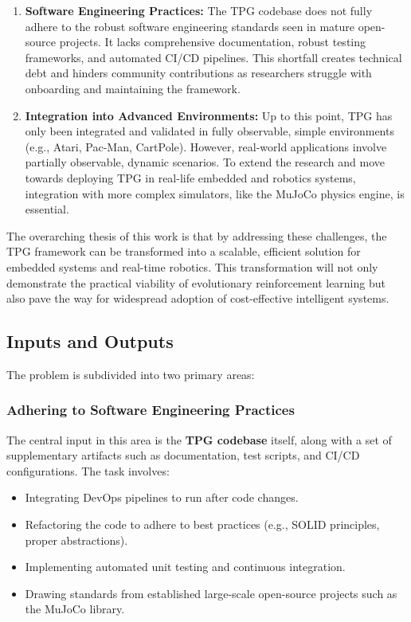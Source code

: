\documentclass{article}
\begin{document}
\begin{enumerate}
  \item \textbf{Software Engineering Practices:}  
    The TPG codebase does not fully adhere to the robust software engineering standards seen in mature open-source projects. It lacks comprehensive documentation, robust testing frameworks, and automated CI/CD pipelines. This shortfall creates technical debt and hinders community contributions as researchers struggle with onboarding and maintaining the framework.

  \item \textbf{Integration into Advanced Environments:}  
    Up to this point, TPG has only been integrated and validated in fully observable, simple environments (e.g., Atari, Pac-Man, CartPole). However, real-world applications involve partially observable, dynamic scenarios. To extend the research and move towards deploying TPG in real-life embedded and robotics systems, integration with more complex simulators, like the MuJoCo physics engine, is essential.
\end{enumerate}

The overarching thesis of this work is that by addressing these challenges, the TPG framework can be transformed into a scalable, efficient solution for embedded systems and real-time robotics. This transformation will not only demonstrate the practical viability of evolutionary reinforcement learning but also pave the way for widespread adoption of cost-effective intelligent systems.

\subsection{Inputs and Outputs}

The problem is subdivided into two primary areas:

\subsubsection{Adhering to Software Engineering Practices}

The central input in this area is the \textbf{TPG codebase} itself, along with a set of supplementary artifacts such as documentation, test scripts, and CI/CD configurations. The task involves:

\begin{itemize}
  \item Integrating DevOps pipelines to run after code changes.
  \item Refactoring the code to adhere to best practices (e.g., SOLID principles, proper abstractions).
  \item Implementing automated unit testing and continuous integration.
  \item Drawing standards from established large-scale open-source projects such as the MuJoCo library.
\end{itemize}
\end{document}
